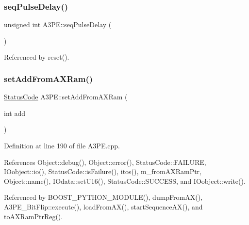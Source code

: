\subsubsection{\texorpdfstring{seq\+Pulse\+Delay()}{seqPulseDelay()}}
{\footnotesize\ttfamily unsigned int A3\+P\+E\+::seq\+Pulse\+Delay (\begin{DoxyParamCaption}{ }\end{DoxyParamCaption})}



Referenced by reset().

\mbox{\label{classA3PE_a834fde5951d2c1bf6b41842520360fce}} 
\subsubsection{\texorpdfstring{set\+Add\+From\+A\+X\+Ram()}{setAddFromAXRam()}}
{\footnotesize\ttfamily \hyperlink{classStatusCode}{Status\+Code} A3\+P\+E\+::set\+Add\+From\+A\+X\+Ram (\begin{DoxyParamCaption}\item[{int}]{add }\end{DoxyParamCaption})}



Definition at line 190 of file A3\+P\+E.\+cpp.



References Object\+::debug(), Object\+::error(), Status\+Code\+::\+F\+A\+I\+L\+U\+RE, I\+Oobject\+::io(), Status\+Code\+::is\+Failure(), itos(), m\+\_\+from\+A\+X\+Ram\+Ptr, Object\+::name(), I\+Odata\+::set\+U16(), Status\+Code\+::\+S\+U\+C\+C\+E\+SS, and I\+Oobject\+::write().



Referenced by B\+O\+O\+S\+T\+\_\+\+P\+Y\+T\+H\+O\+N\+\_\+\+M\+O\+D\+U\+L\+E(), dump\+From\+A\+X(), A3\+P\+E\+\_\+\+Bit\+Flip\+::execute(), load\+From\+A\+X(), start\+Sequence\+A\+X(), and to\+A\+X\+Ram\+Ptr\+Reg().


